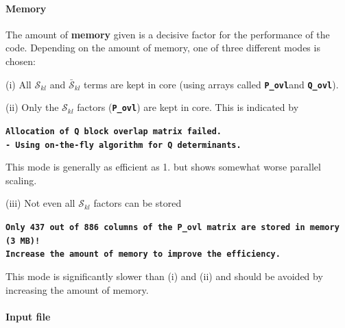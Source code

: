 \documentclass[a4paper,10pt,DIV=15,openany]{scrbook}
\newcommand{\ttt}[1]{\textbf{\texttt{#1}}}
\newenvironment{example}{
  \setlength{\OuterFrameSep}{3pt}
  \vspace{0mm}
  \definecolor{shadecolor}{HTML}{E4F4FF}
  \begin{shaded}
}{
  \end{shaded}
}
\begin{document}
\paragraph{Memory}

The amount of \textbf{memory} given is a decisive factor for the performance of the code.
Depending on the amount of memory, one of three different modes is chosen:

(i) All $\mathcal{S}_{kl}$ and $\bar{\mathcal{S}}_{kl}$ terms are kept in core (using arrays called \ttt{P\_ovl}and \ttt{Q\_ovl}).

(ii) Only the $\mathcal{S}_{kl}$ factors (\ttt{P\_ovl}) are kept in core. This is indicated by
\begin{example}
\ttt{Allocation of Q block overlap matrix failed.\\
  - Using on-the-fly algorithm for Q determinants.}
\end{example}
This mode is generally as efficient as 1. but shows somewhat worse parallel scaling.

(iii) Not even all $\mathcal{S}_{kl}$ factors can be stored
\begin{example}
\ttt{Only 437 out of 886 columns of the P\_ovl matrix are stored in memory (3 MB)!\\
 Increase the amount of memory to improve the efficiency.}
\end{example}
This mode is significantly slower than (i) and (ii) and should be avoided by increasing the amount of memory.

\paragraph{Input file}
\end{document}
